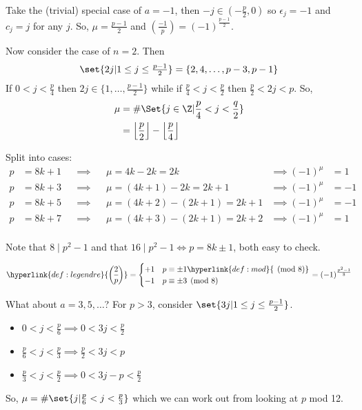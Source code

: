 \documentclass{article}
\newcommand{\legendre}[2]{\genfrac{(}{)}{}{}{#1}{#2}}
\DeclarePairedDelimiter\floor{\lfloor}{\rfloor}
\begin{document}

\begin{eg}
    Take the (trivial) special case of $a = -1$, then $-j \in (-\frac{p}{2}, 0)$ so $\epsilon_j = -1$ and $c_j = j$ for any $j$.
    So, $\mu = \frac{p-1}{2}$ and $\legendre{-1}{p} = (-1)^\frac{p-1}{2}$.

    Now consider the case of $n=2$.  Then
    \begin{equation*}
        \set{2j | 1 \leq j \leq \tfrac{p-1}{2}} = \{2, 4, \dotsc, p-3, p-1\}
    \end{equation*}
    If $0 < j < \frac{p}{4}$ then $2j \in \{1, \dotsc, \frac{p-1}{2}\}$ while if $\frac{p}{4} < j < \frac{p}{2}$ then $\frac{p}{2} < 2j < p$.
    So,
    \begin{align*}
        \mu &= \# \Set{j \in \Z | \frac{p}{4} < j < \frac{q}{2}} \\
            &= \floor*{\frac{p}{2}} - \floor*{\frac{p}{4}}
    \end{align*}

    Split into cases:
    \begin{align*}
        p &= 8k+1 &&\implies &&\mu = 4k - 2k = 2k &\implies (-1)^\mu &= 1 \\
        p &= 8k+3 &&\implies &&\mu = (4k+1) - 2k = 2k+1 &\implies (-1)^\mu &= -1 \\
        p &= 8k+5 &&\implies &&\mu = (4k+2) - (2k+1) = 2k+1 &\implies (-1)^\mu &= -1 \\
        p &= 8k+7 &&\implies &&\mu = (4k+3) - (2k+1) = 2k+2 &\implies (-1)^\mu &= 1 \\
    \end{align*}

    Note that $8 \mid p^2 - 1$ and that $16 \mid p^2 - 1 \iff p = 8k \pm 1$, both easy to check.
\end{eg}

\begin{ncor}\label{cor:3.4}
    \begin{equation*}
        \hyperlink{def:legendre}{\legendre{2}{p}} =
        \begin{cases}
            +1 & p \equiv \pm 1 \hyperlink{def:mod}{\pmod{8}} \\
            -1 & p \equiv \pm 3 \pmod{8}
        \end{cases}
        = (-1)^\frac{p^2 - 1}{8}
    \end{equation*}
\end{ncor}

What about $a = 3, 5, \dotsc$?  For $p > 3$, consider $\set{3j | 1 \leq j \leq \frac{p-1}{2}}$.
\begin{itemize}[label={}]
    \item $0 < j < \frac{p}{6} \implies 0 < 3j < \frac{p}{2}$
    \item $\frac{p}{6} < j < \frac{p}{3} \implies \frac{p}{2} < 3j < p$
    \item $\frac{p}{3} < j < \frac{p}{2} \implies 0 < 3j - p < \frac{p}{2}$
\end{itemize}
So, $\mu = \#\set{j | \frac{p}{6} < j < \frac{p}{3}}$ which we can work out from looking at $p$ mod 12.
\end{document}
